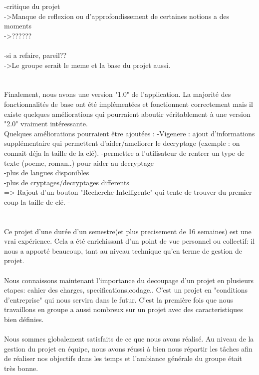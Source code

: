 \documentclass[a4]{article}
\begin{document}
	-critique du projet \\
	->Manque de reflexion ou d'approfondissement de certaines notions a des moments \\
	->?????? \\ \\
	
	
		
	-si a refaire, pareil?? \\
	->Le groupe serait le meme et la base du projet aussi. \\ \\ \\
	
	
	Finalement, nous avons une version "1.0" de l’application. La majorité des fonctionnalités
de base ont été implémentées et fonctionnent correctement mais il existe quelques
améliorations qui pourraient aboutir véritablement à une version "2.0" vraiment intéressante. \\
Quelques améliorations pourraient être ajoutées :
-Vigenere : ajout d'informations supplémentaire qui permettent d'aider/ameliorer le decryptage 
(exemple : on connait déja la taille de la clé).
-permettre a l'utilisateur de rentrer un type de texte (poeme, roman..) pour aider au decryptage \\
-plus de langues disponibles \\
-plus de cryptages/decryptages differents \\
=> Rajout d'un bouton "Recherche Intelligente" qui tente de trouver du premier coup la taille de clé.
-\\ \\ \\

	
	
Ce projet d'une durée d'un semestre(et plus precisement de 16 semaines) est une vrai expérience.
Cela a été enrichissant d'un point de vue personnel ou collectif:
il nous a apporté beaucoup, tant au
niveau technique qu’en terme de gestion de projet.  \\  \\
Nous connaissons maintenant l'importance du decoupage d'un projet en plusieurs etapes: cahier des charges, specifications,codage..
C'est un projet en "conditions d'entreprise" qui nous servira dans le futur.
C’est la première fois que nous travaillons en groupe a aussi nombreux sur un projet avec des caracteristiques bien définies. \\ \\
Nous sommes globalement satisfaits de ce que nous avons réalisé.
 Au niveau de la gestion du projet en équipe, nous avons réussi à bien nous répartir les
tâches afin de réaliser nos objectifs dans les temps et l'ambiance générale du groupe était très
bonne. \\ \\ \\





	
	
	
\end{document}
